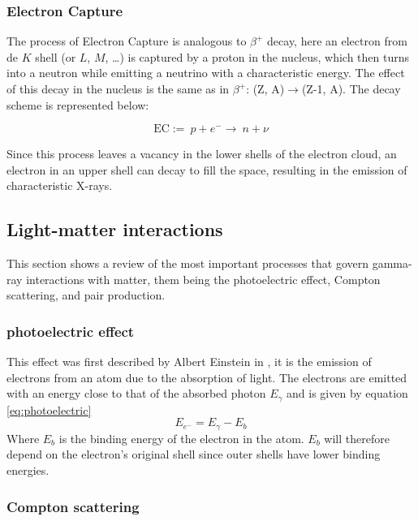 \subsubsection{Electron Capture}

The process of Electron Capture is analogous to $\beta^+$ decay, here an electron from de $K$ shell (or $L$, $M$, \dots) is captured by a proton in the nucleus, which then turns into a neutron while emitting a neutrino with a characteristic energy. The effect of this decay in the nucleus is the same as in $\beta^+$: (Z, A)$\rightarrow$(Z-1, A). The decay scheme is represented below:

\begin{equation}
  \text{EC} :=~ p + e^- \rightarrow ~ n + \nu
\end{equation}

Since this process leaves a vacancy in the lower shells of the electron cloud, an electron in an upper shell can decay to fill the space, resulting in the emission of characteristic X-rays.

\subsection{Light-matter interactions}

This section shows a review of the most important processes that govern gamma-ray interactions with matter, them being the photoelectric effect, Compton scattering, and pair production.

\subsubsection{photoelectric effect}

This effect was first described by Albert Einstein in \cite{einstein1905heuristic}, it is the emission of electrons from an atom due to the absorption of light. The electrons are emitted with an energy close to that of the absorbed photon $E_\gamma$ and is given by equation \eqref{eq:photoelectric}
\begin{equation}
  E_{e^-} = E_\gamma - E_b \label{eq:photoelectric}
\end{equation}
Where $E_b$ is the binding energy of the electron in the atom. $E_b$ will therefore depend on the electron's original shell since outer shells have lower binding energies.

\subsubsection{Compton scattering}\label{sec:compt_scattering}

